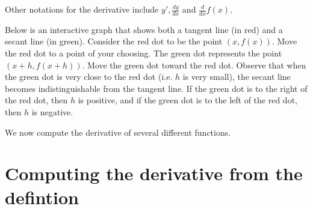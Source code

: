 \documentclass{ximera}
\begin{document}
\begin{remark}
Other notations for the derivative include $y',\frac{dy}{dx}$ and $\frac{d}{dx} f(x)$.\\
\end{remark}

Below is an interactive graph that shows both a tangent line (in red) and a secant line (in green).
Consider the red dot to be the point $(x, f(x))$. Move the red dot to a point of your choosing.
The green dot represents the point $(x+h, f(x+h))$. Move the green dot toward the red dot.
Observe that when the green dot is very close to the red dot (i.e. $h$ is very small), 
the secant line becomes indistinguishable from the tangent line. 
If the green dot is to the right of the red dot, then $h$ is positive, and if the green dot is to the left of 
the red dot, then $h$ is negative.









We now compute the derivative of several different functions.\\

\section{Computing the derivative from the defintion}
\end{document}
